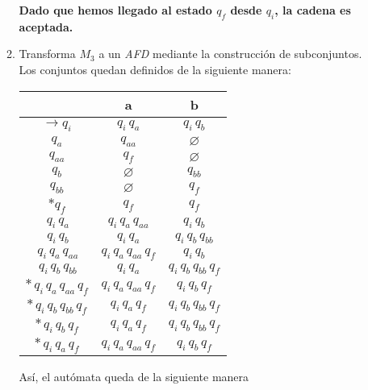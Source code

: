 \documentclass{article}
\begin{document}
\begin{enumerate}
\begin{enumerate}
        \textbf{Dado que hemos llegado al estado $q_f$ desde $q_i$, la cadena es aceptada.}\\
        
        \newpage
        \item Transforma $M_3$ a un \textit{AFD} mediante la construcción de subconjuntos.\\
        
        Los conjuntos quedan definidos de la siguiente manera:
        
        \begin{table}[h]
        \centering
        \begin{tabular}{c|c|c}
        \hline
         & a & b \\
        \hline
        $\rightarrow q_i$ & $q_i\,q_a$ & $q_i\,q_b$ \\
        $q_a$             & $q_{aa}$   & $\varnothing$ \\
        $q_{aa}$          & $q_f$      & $\varnothing$ \\
        $q_b$             & $\varnothing$ & $q_{bb}$ \\
        $q_{bb}$          & $\varnothing$ & $q_f$ \\
        $*q_f$             & $q_f$      & $q_f$ \\
        \hline
        $\,q_i\,q_a$     & $q_i\,q_a\,q_{aa}$ & $q_i\,q_b$ \\
        $\,q_i\,q_b$     & $q_i\,q_a$         & $q_i\,q_b\,q_{bb}$ \\
        $\,q_i\,q_a\,q_{aa}$ & $q_i\,q_a\,q_{aa}\,q_f$ & $q_i\,q_b$ \\
        $\,q_i\,q_b\,q_{bb}$ & $q_i\,q_a$         & $q_i\,q_b\,q_{bb}\,q_f$ \\
        $*\,q_i\,q_a\,q_{aa}\,q_f$    & $q_i\,q_a\,q_{aa}\,q_f$      & $q_i\,q_b\,q_f$ \\
        $*\,q_i\,q_b\,q_{bb}\,q_f$ & $q_i\,q_a\,q_f$ & $q_i\,q_b\,q_{bb}\,q_f$ \\
        $*\,q_i\,q_b\,q_f$ & $q_i\,q_a\,q_f$         & $q_i\,q_b\,q_{bb}\,q_f$ \\
        $*\,q_i\,q_a\,q_f$ & $q_i\,q_a\,q_{aa}\,q_f$         & $q_i\,q_b\,q_f$ \\
        \hline
        \end{tabular}
        \end{table}

        Así, el autómata queda de la siguiente manera
        \begin{center}
\end{center}
\end{enumerate}
\end{enumerate}
\end{document}
